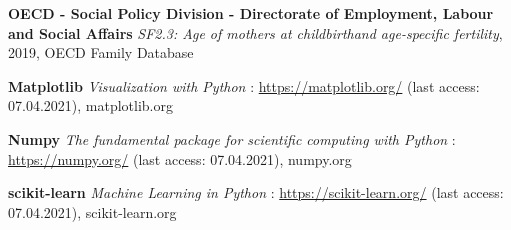 \begin{thebibliography}{9}
\textbf{OECD - Social Policy Division - Directorate of Employment, Labour and Social Affairs}
\textit{SF2.3: Age of mothers at childbirthand age-specific fertility},
2019, OECD Family Database


\textbf{Matplotlib}
\textit{Visualization with Python} : \url{https://matplotlib.org/} (last access: 07.04.2021),
matplotlib.org

\textbf{Numpy}
\textit{The fundamental package for scientific computing with Python} : \url{https://numpy.org/} (last access: 07.04.2021),
numpy.org

\textbf{scikit-learn}
\textit{Machine Learning in Python} : \url{https://scikit-learn.org/} (last access: 07.04.2021),
scikit-learn.org


\end{thebibliography}
